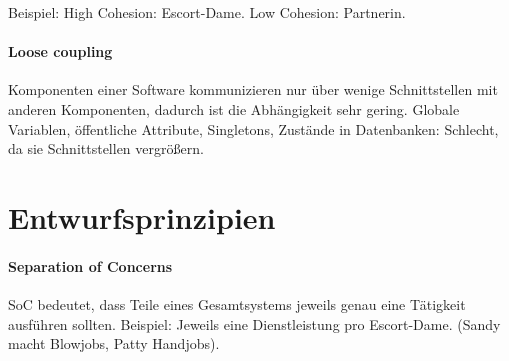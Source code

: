 Beispiel: High Cohesion: Escort-Dame. Low Cohesion: Partnerin.

\paragraph{Loose coupling}\label{loose-coupling}
Komponenten einer Software kommunizieren nur über wenige Schnittstellen
mit anderen Komponenten, dadurch ist die Abhängigkeit sehr gering.
Globale Variablen, öffentliche Attribute, Singletons, Zustände in
Datenbanken: Schlecht, da sie Schnittstellen vergrößern.

\section{Entwurfsprinzipien}
\paragraph{Separation of Concerns}
SoC bedeutet, dass Teile eines Gesamtsystems jeweils genau eine Tätigkeit
ausführen sollten.
Beispiel: Jeweils eine Dienstleistung pro Escort-Dame. (Sandy macht Blowjobs,
Patty Handjobs).
